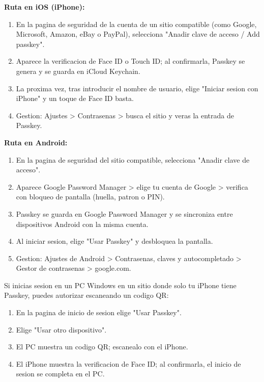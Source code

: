 
\textbf{Ruta en iOS (iPhone):}

\begin{enumerate}
  \item En la pagina de seguridad de la cuenta de un sitio compatible (como Google, Microsoft, Amazon, eBay o PayPal), selecciona "Anadir clave de acceso / Add passkey".
  \item Aparece la verificacion de Face ID o Touch ID; al confirmarla, Passkey se genera y se guarda en iCloud Keychain.
  \item La proxima vez, tras introducir el nombre de usuario, elige "Iniciar sesion con iPhone" y un toque de Face ID basta.
  \item Gestion: Ajustes > Contrasenas > busca el sitio y veras la entrada de Passkey.
\end{enumerate}

\textbf{Ruta en Android:}

\begin{enumerate}
  \item En la pagina de seguridad del sitio compatible, selecciona "Anadir clave de acceso".
  \item Aparece Google Password Manager > elige tu cuenta de Google > verifica con bloqueo de pantalla (huella, patron o PIN).
  \item Passkey se guarda en Google Password Manager y se sincroniza entre dispositivos Android con la misma cuenta.
  \item Al iniciar sesion, elige "Usar Passkey" y desbloquea la pantalla.
  \item Gestion: Ajustes de Android > Contrasenas, claves y autocompletado > Gestor de contrasenas > google.com.
\end{enumerate}


Si inicias sesion en un PC Windows en un sitio donde solo tu iPhone tiene Passkey, puedes autorizar escaneando un codigo QR:

\begin{enumerate}
  \item En la pagina de inicio de sesion elige "Usar Passkey".
  \item Elige "Usar otro dispositivo".
  \item El PC muestra un codigo QR; escanealo con el iPhone.
  \item El iPhone muestra la verificacion de Face ID; al confirmarla, el inicio de sesion se completa en el PC.
\end{enumerate}

